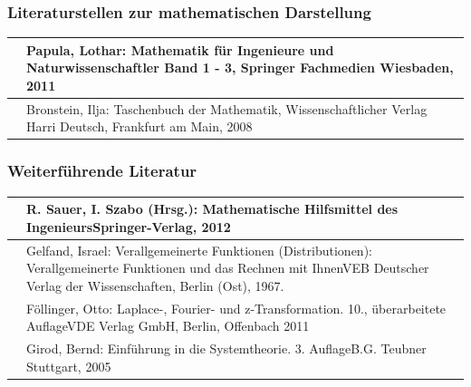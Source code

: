 \subsubsection{ Literaturstellen zur mathematischen Darstellung}

\begin{tabular}{|p{0.6in}|p{5.7in}|} \hline 
[Papu11] & Papula, Lothar: Mathematik f\"{u}r Ingenieure und Naturwissenschaftler Band 1 - 3, Springer Fachmedien Wiesbaden, 2011 \\ \hline 
[Bron79] & Bronstein, Ilja: Taschenbuch der Mathematik, Wissenschaftlicher Verlag Harri Deutsch, Frankfurt am Main, 2008 \\ \hline 
\end{tabular}


\subsubsection{ Weiterf\"{u}hrende Literatur}

\begin{tabular}{|p{0.6in}|p{5.7in}|} \hline 
[Saue12] & R. Sauer, I. Szabo (Hrsg.): Mathematische Hilfsmittel des IngenieursSpringer-Verlag, 2012 \\ \hline 
[Gelf67] & Gelfand, Israel: Verallgemeinerte Funktionen (Distributionen): Verallgemeinerte Funktionen und das Rechnen mit IhnenVEB Deutscher Verlag der Wissenschaften, Berlin (Ost), 1967. \\ \hline 
[Foel11] & F\"{o}llinger, Otto: Laplace-, Fourier- und z-Transformation. 10., \"{u}berarbeitete AuflageVDE Verlag GmbH, Berlin, Offenbach 2011 \\ \hline 
[Giro05] & Girod, Bernd: Einf\"{u}hrung in die Systemtheorie. 3. AuflageB.G. Teubner Stuttgart, 2005 \\ \hline 
\end{tabular}